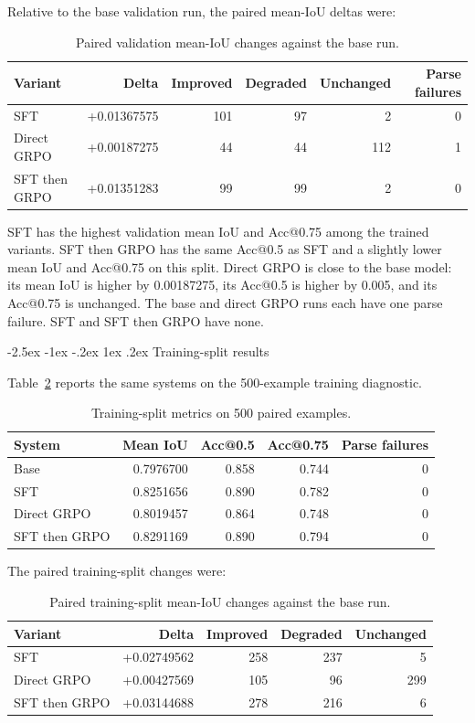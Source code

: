 \documentclass[11pt]{article}
\makeatletter
\renewcommand{\subsection}{\@startsection{subsection}{2}{\z@}%
  {-2.5ex \@plus -1ex \@minus -.2ex}%
  {1ex \@plus .2ex}%
  {\normalfont\normalsize\bfseries}}
\makeatother
\begin{document}
Relative to the base validation run, the paired mean-IoU deltas were:

\begin{table}[h]
\raggedright
\caption{Paired validation mean-IoU changes against the base run.}
\label{tab:validation-paired}
\begin{tabular}{lrrrrr}
\hline
Variant & Delta & Improved & Degraded & Unchanged & Parse failures \\
\hline
SFT & +0.01367575 & 101 & 97 & 2 & 0 \\
Direct GRPO & +0.00187275 & 44 & 44 & 112 & 1 \\
SFT then GRPO & +0.01351283 & 99 & 99 & 2 & 0 \\
\hline
\end{tabular}
\end{table}

SFT has the highest validation mean IoU and Acc@0.75 among the trained
variants. SFT then GRPO has the same Acc@0.5 as SFT and a slightly lower mean
IoU and Acc@0.75 on this split. Direct GRPO is close to the base model: its
mean IoU is higher by 0.00187275, its Acc@0.5 is higher by 0.005, and its
Acc@0.75 is unchanged. The base and direct GRPO runs each have one parse
failure. SFT and SFT then GRPO have none.

\subsection{Training-split results}

Table~\ref{tab:training} reports the same systems on the 500-example training
diagnostic.

\begin{table}[h]
\raggedright
\caption{Training-split metrics on 500 paired examples.}
\label{tab:training}
\begin{tabular}{lrrrr}
\hline
System & Mean IoU & Acc@0.5 & Acc@0.75 & Parse failures \\
\hline
Base & 0.7976700 & 0.858 & 0.744 & 0 \\
SFT & 0.8251656 & 0.890 & 0.782 & 0 \\
Direct GRPO & 0.8019457 & 0.864 & 0.748 & 0 \\
SFT then GRPO & 0.8291169 & 0.890 & 0.794 & 0 \\
\hline
\end{tabular}
\end{table}

The paired training-split changes were:

\begin{table}[h]
\raggedright
\caption{Paired training-split mean-IoU changes against the base run.}
\label{tab:training-paired}
\begin{tabular}{lrrrr}
\hline
Variant & Delta & Improved & Degraded & Unchanged \\
\hline
SFT & +0.02749562 & 258 & 237 & 5 \\
Direct GRPO & +0.00427569 & 105 & 96 & 299 \\
SFT then GRPO & +0.03144688 & 278 & 216 & 6 \\
\hline
\end{tabular}
\end{table}
\end{document}
